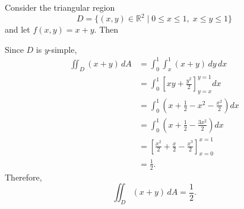   \begin{example}
    \label{ex:double-integral-over-a-non-rectangular-region}
    Consider the triangular region
    \begin{equation}
      D = \{(x,y) \in \mathbb{R}^2 \mid 0 \leq x \leq 1,\; x \leq y \leq 1\}
    \end{equation}
    and let $f(x,y) = x+y$. Then 
    \begin{center}
    \end{center}
    Since $D$ is $y$-simple,
    \begin{align*}
      \iint_D (x+y)\,dA
      &= \int_0^1 \int_x^1 (x+y)\,dy\,dx \\
      &= \int_0^1 \left[ xy + \frac{y^2}{2} \right]_{y=x}^{y=1} dx \\
      &= \int_0^1 \left( x+\frac{1}{2} - x^2 - \frac{x^2}{2} \right) dx \\
      &= \int_0^1 \left( x+\frac{1}{2} - \frac{3x^2}{2} \right) dx \\
      &= \left[ \frac{x^2}{2} + \frac{x}{2} - \frac{x^3}{2} \right]_{x=0}^{x=1} \\
      &= \frac{1}{2}.
    \end{align*}
    Therefore,
    \begin{equation}
      \iint_D (x+y)\,dA = \frac{1}{2}.
    \end{equation}
  \end{example}

